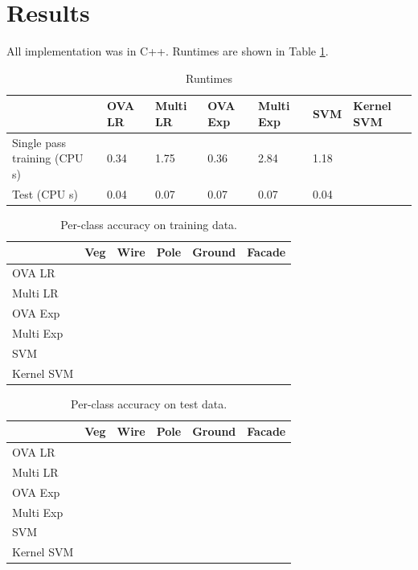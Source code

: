 \documentclass[a4paper]{article}
\begin{document}
\section{Results}
All implementation was in C++. Runtimes are shown in Table \ref{table:runtimes}.

\begin{table}[h]
\centering
\begin{tabular}{|l|l|l|l|l|l|l|}
\hline
& OVA LR & Multi LR & OVA Exp & Multi Exp & SVM & Kernel SVM \\ \hline
Single pass training (CPU s) & 0.34 & 1.75 & 0.36 & 2.84 & 1.18 &  \\ \hline
Test (CPU s) & 0.04 & 0.07 & 0.07 & 0.07 & 0.04 &  \\ \hline
\end{tabular}
\caption{Runtimes}
\label{table:runtimes}
\end{table}

\begin{table}[h]
\centering
\begin{tabular}{|l|l|l|l|l|l|}
\hline
 & Veg & Wire & Pole & Ground & Facade \\
\hline
OVA LR &  &  &  &  &  \\
\hline
Multi LR &  &  &  &  &  \\
\hline
OVA Exp &  &  &  &  &  \\
\hline
Multi Exp &  &  &  &  &  \\
\hline
SVM &  &  &  &  &  \\
\hline
Kernel SVM &  &  &  &  & \\
\hline
\end{tabular}
\caption{Per-class accuracy on training data.}
\end{table}

\begin{table}[h]
\centering
\begin{tabular}{|l|l|l|l|l|l|}
\hline
 & Veg & Wire & Pole & Ground & Facade \\
\hline
OVA LR &  &  &  &  &  \\
\hline
Multi LR &  &  &  &  &  \\
\hline
OVA Exp &  &  &  &  &  \\
\hline
Multi Exp &  &  &  &  &  \\
\hline
SVM &  &  &  &  &  \\
\hline
Kernel SVM &  &  &  &  & \\
\hline
\end{tabular}
\caption{Per-class accuracy on test data.}
\end{table}
\end{document}
